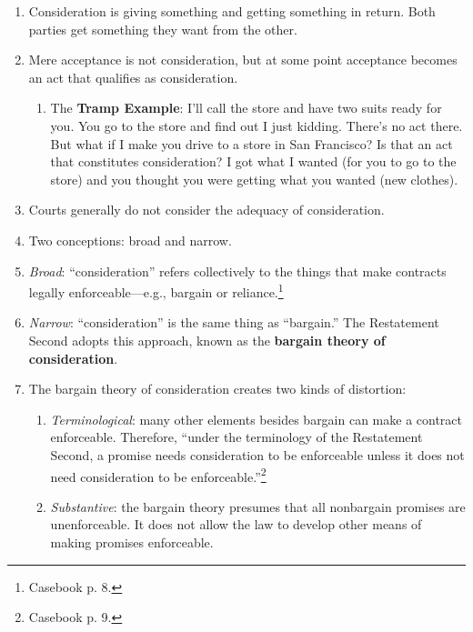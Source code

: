 \begin{enumerate}
    \item Consideration is giving something and getting something in return. 
    Both parties get something they want from the other.
    \item Mere acceptance is not consideration, but at some point acceptance 
    becomes an act that qualifies as consideration.
    \begin{enumerate}
        \item The \textbf{Tramp Example}: I'll call the store and have two 
        suits ready for you. You go to the store and find out I just kidding. 
        There's no act there. But what if I make you drive to a store in San 
        Francisco? Is that an act that constitutes consideration? I got what I 
        wanted (for you to go to the store) and you thought you were getting 
        what you wanted (new clothes).
    \end{enumerate}
    \item Courts generally do not consider the adequacy of consideration.
    \item Two conceptions: broad and narrow.
    \item \emph{Broad}: ``consideration'' refers collectively to the things 
    that make contracts legally enforceable---e.g., bargain or 
    reliance.\footnote{Casebook p. 8.}
    \item \emph{Narrow}: ``consideration'' is the same thing as ``bargain.'' 
    The Restatement Second adopts this approach, known as the \textbf{bargain 
    theory of consideration}.
    \item The bargain theory of consideration creates two kinds of distortion:
    \begin{enumerate}
        \item \emph{Terminological}: many other elements besides bargain can 
        make a contract enforceable. Therefore, ``under the terminology of the 
        Restatement Second, a promise needs consideration to be enforceable 
        unless it does not need consideration to be 
        enforceable.''\footnote{Casebook p. 9.}
        \item \emph{Substantive}: the bargain theory presumes that all 
        nonbargain promises are unenforceable. It does not allow the law to 
        develop other means of making promises enforceable.
    \end{enumerate}
\end{enumerate}

